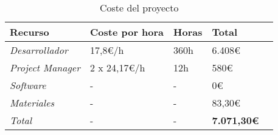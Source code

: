 \bigskip
\begin{table}[H]
	\centering
	\begin{tabular}{|l|l|l|l|l|}
		\rowcolor{udcpink!25}
		\hline
		\small \textbf{Recurso}         & \small \textbf{Coste por hora} & \small \textbf{Horas} & \small \textbf{Total}     \\ \hline
		\small \textit{Desarrollador}   & \small 17,8€/h                 & \small 360h           & \small 6.408€             \\ \hline
		\small \textit{Project Manager} & \small 2 x 24,17€/h            & \small 12h            & \small 580€               \\ \hline
		\small \textit{Software}        & \small -                       & \small -              & \small 0€                 \\ \hline
		\small \textit{Materiales}      & \small -                       & \small -              & \small 83,30€             \\ \hline
		\small \textit{Total}           & \small -                       & \small -              & \small \textbf{7.071,30€} \\ \hline
	\end{tabular}
	\caption{Coste del proyecto}
	\label{tab:costes}
\end{table}
